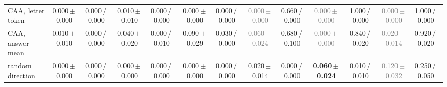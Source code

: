 \begin{tabular}{@{}lcccccccccccc@{}}
CAA, letter token & 0.000\,{\scriptsize$\pm$\,0.000} & {\scriptsize 0.000\,/\,0.000} & 0.010\,{\scriptsize$\pm$\,0.010} & {\scriptsize 0.000\,/\,0.000} & 0.000\,{\scriptsize$\pm$\,0.000} & {\scriptsize 0.000\,/\,0.000} & \textcolor{gray}{0.000\,{\scriptsize$\pm$\,0.000}} & {\scriptsize 0.660\,/\,0.000} & \textcolor{gray}{0.000\,{\scriptsize$\pm$\,0.000}} & {\scriptsize 1.000\,/\,0.000} & \textcolor{gray}{0.000\,{\scriptsize$\pm$\,0.000}} & {\scriptsize 1.000\,/\,0.000} \\
CAA, answer mean & 0.010\,{\scriptsize$\pm$\,0.010} & {\scriptsize 0.000\,/\,0.000} & 0.040\,{\scriptsize$\pm$\,0.020} & {\scriptsize 0.000\,/\,0.010} & 0.090\,{\scriptsize$\pm$\,0.029} & {\scriptsize 0.030\,/\,0.000} & \textcolor{gray}{0.060\,{\scriptsize$\pm$\,0.024}} & {\scriptsize 0.680\,/\,0.100} & \textcolor{gray}{0.000\,{\scriptsize$\pm$\,0.000}} & {\scriptsize 0.840\,/\,0.020} & \textcolor{gray}{0.020\,{\scriptsize$\pm$\,0.014}} & {\scriptsize 0.920\,/\,0.020} \\
random direction & 0.000\,{\scriptsize$\pm$\,0.000} & {\scriptsize 0.000\,/\,0.000} & 0.000\,{\scriptsize$\pm$\,0.000} & {\scriptsize 0.000\,/\,0.000} & 0.000\,{\scriptsize$\pm$\,0.000} & {\scriptsize 0.000\,/\,0.000} & 0.020\,{\scriptsize$\pm$\,0.014} & {\scriptsize 0.000\,/\,0.000} & \textbf{0.060\,{\scriptsize$\pm$\,0.024}} & {\scriptsize 0.010\,/\,0.010} & \textcolor{gray}{0.120\,{\scriptsize$\pm$\,0.032}} & {\scriptsize 0.250\,/\,0.050} \\
\bottomrule
\end{tabular}

